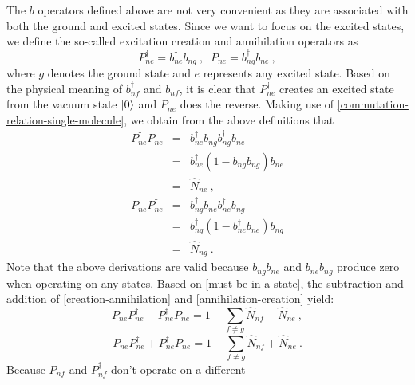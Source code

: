 The $b$ operators defined above are not very convenient as they are associated with both the ground and excited states. Since 
we want to focus on the excited states, we define the so-called excitation creation and annihilation operators
as  
\begin{equation}
P_{ne}^{\dagger} = b_{ne}^{\dagger} b_{ng} \ , \;\;P_{ne}=b_{ng}^{\dagger} b_{ne} \ , \label{creation&annihilation}
\end{equation}
where $g$ denotes the ground state and $e$ represents any excited state. 
Based on the physical meaning of $b_{nf}^{\dagger}$ and $b_{nf}$, it is clear that $P_{ne}^{\dagger}$ creates an 
excited state from the vacuum state $| 0 \rangle$ and $P_{ne}$ does the reverse.
Making use of \autoref{commutation-relation-single-molecule}, we obtain from the above definitions that
\begin{eqnarray}
P_{ne}^{\dagger} P_{ne} &=& b_{ne}^{\dagger} b_{ng}b_{ng}^{\dagger} b_{ne} \nonumber \\
                                      &=& b_{ne}^{\dagger}(1-b_{ng}^{\dagger}b_{ng})b_{ne} \nonumber \\
                                      &=& \hat{N}_{ne} \ , \label{creation-annihilation}
\end{eqnarray}
\begin{eqnarray}
P_{ne} P_{ne}^{\dagger} &=& b_{ng}^{\dagger} b_{ne} b_{ne}^{\dagger} b_{ng} \nonumber \\
                                      &=& b_{ng}^{\dagger}(1-b_{ne}^{\dagger}b_{ne})b_{ng} \nonumber \\
                                      &=& \hat{N}_{ng} \ . \label{annihilation-creation}
\end{eqnarray}
Note that the above derivations are valid because $b_{ng} b_{ne}$ and $b_{ne} b_{ng}$ produce zero when operating on any states. 
Based on \autoref{must-be-in-a-state}, the subtraction and addition of \autoref{creation-annihilation} and \autoref{annihilation-creation} yield:
\begin{equation}
P_{ne} P_{ne}^{\dagger} - P_{ne}^{\dagger} P_{ne} = 1 - \sum_{f\neq g} \hat{N}_{nf}  -\hat{N}_{ne}\ , \label{exact-relation}
\end{equation}
\begin{equation}
P_{ne} P_{ne}^{\dagger} + P_{ne}^{\dagger} P_{ne} = 1  - \sum_{f\neq g} \hat{N}_{nf}  + \hat{N}_{ne} \ . \label{eqn:addition}
\end{equation}
Because $P_{nf}$ and $P_{nf}^{\dagger}$ don't operate on a different
